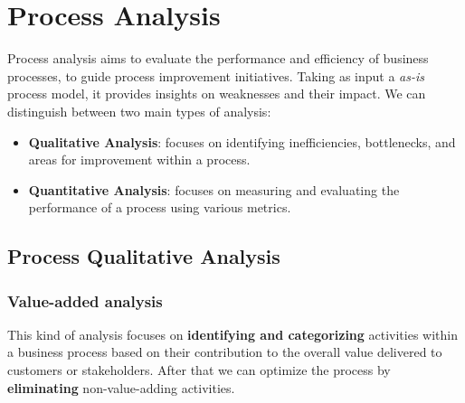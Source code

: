 \section{Process Analysis}
Process analysis aims to evaluate the performance and efficiency of business processes, to guide process improvement initiatives.
Taking as input a \textit{as-is} process model, it provides insights on weaknesses and their impact.
We can distinguish between two main types of analysis:
\begin{itemize}
    \item \textbf{Qualitative Analysis}: focuses on identifying inefficiencies, bottlenecks, and areas for improvement within a process.
    \item \textbf{Quantitative Analysis}: focuses on measuring and evaluating the performance of a process using various metrics.
\end{itemize}

\subsection{Process Qualitative Analysis}
\subsubsection{Value-added analysis}
This kind of analysis focuses on \textbf{identifying and categorizing} activities within a business process based on their contribution to the overall value delivered to customers or stakeholders.
After that we can optimize the process by \textbf{eliminating} non-value-adding activities.
